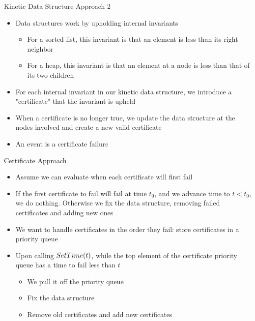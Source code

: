 \documentclass[aspectratio=169, handout]{beamer}
\begin{document}
\begin{frame}{Kinetic Data Structure Approach 2}
    \begin{itemize}
        \item Data structures work by upholding internal invariants
        \begin{itemize}
            \item For a sorted list, this invariant is that an element is less than its right neighbor
            \item For a heap, this invariant is that an element at a node is less than that of its two children
        \end{itemize}
        \pause
        \item For each internal invariant in our kinetic data structure, we introduce a "certificate" that the invariant is upheld
        \item When a certificate is no longer true, we update the data structure at the nodes involved and create a new valid certificate
        \item An event is a certificate failure
    \end{itemize}
\end{frame}

\begin{frame}{Certificate Approach}
    \begin{itemize}
        \item Assume we can evaluate when each certificate will first fail
        \item If the first certificate to fail will fail at time $t_0$, and we advance time to $t < t_0$, we do nothing. Otherwise we fix the data structure, removing failed certificates and adding new ones
        \pause
        \item We want to handle certificates in the order they fail: store certificates in a priority queue
        \item Upon calling $\emph{SetTime}(t)$, while the top element of the certificate priority queue has a time to fail less than $t$
        \begin{itemize}
            \item We pull it off the priority queue
            \item Fix the data structure
            \item Remove old certificates and add new certificates
        \end{itemize}
    \end{itemize}
\end{frame}
\end{document}
